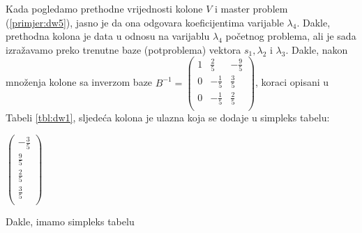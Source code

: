 \documentclass[a4paper, utf8, 11pt, colorlinks]{book}
\begin{document}
Kada pogledamo prethodne vrijednosti kolone $V$ i master problem (\ref{primjer:dw5}), jasno je da ona odgovara koeficijentima varijable $\lambda_4$. Dakle, prethodna kolona je data u odnosu na varijablu $\lambda_4$ početnog problema, ali je sada izražavamo preko trenutne baze (potproblema) vektora $s_1, \lambda_2$ i $\lambda_3$.  Dakle, nakon množenja kolone sa inverzom baze 
$B^{-1}= 
\begin{pmatrix}
	 1 &  \frac{2}{5}   & -\frac{9}{5} \\
	 0 &  -\frac{1}{5}  & \frac{3}{5}  \\
	 0 &  -\frac{1}{5}  & \frac{2}{5}  \\ 
\end{pmatrix} $, koraci opisani u Tabeli \ref{tbl:dw1}, sljedeća kolona je ulazna koja se dodaje u simpleks tabelu:

\begin{center}
	
	$\begin{pmatrix}
		-\frac{3}{5}            \\
		\frac{9}{5}     \\
		 \frac{2}{5}       \\
		\frac{3}{5}    \\
	\end{pmatrix}$
\end{center}
Dakle, imamo simpleks tabelu 
\end{document}
